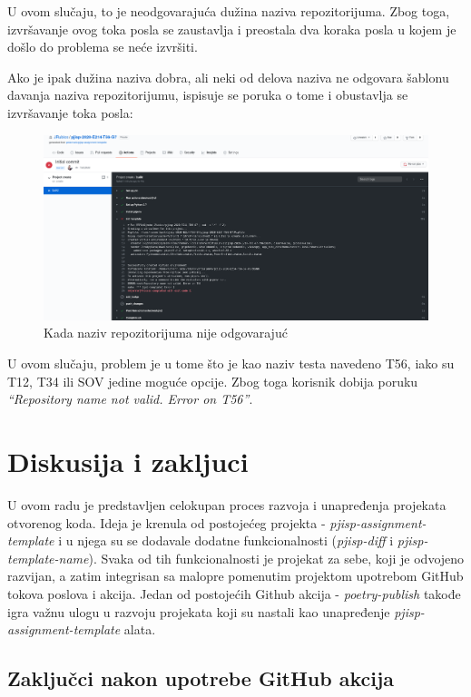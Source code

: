 \documentclass[12pt]{report}
\begin{document}
U ovom slučaju, to je neodgovarajuća dužina naziva repozitorijuma. Zbog toga, izvršavanje ovog toka posla se zaustavlja i preostala dva koraka posla u kojem je došlo do problema se neće izvršiti.

Ako je ipak dužina naziva dobra, ali neki od delova naziva ne odgovara šablonu davanja naziva repozitorijumu, ispisuje se poruka o tome i obustavlja se izvršavanje toka posla:

\begin{figure}[H]
    \centering
    \includegraphics[width=\linewidth]{images/20.png}
    \caption{Kada naziv repozitorijuma nije odgovarajuć}
\end{figure}

U ovom slučaju, problem je u tome što je kao naziv testa navedeno T56, iako su T12, T34 ili SOV jedine moguće opcije. Zbog toga korisnik dobija poruku \textit{``Repository name not valid. Error on T56''}.

\chapter{Diskusija i zakljuci}

U ovom radu je predstavljen celokupan proces razvoja i unapređenja projekata otvorenog koda. Ideja je krenula od postojećeg projekta - \textit{pjisp-assignment-template} i u njega su se dodavale dodatne funkcionalnosti (\textit{pjisp-diff} i \textit{pjisp-template-name}). Svaka od tih funkcionalnosti je projekat za sebe, koji je odvojeno razvijan, a zatim integrisan sa malopre pomenutim projektom upotrebom GitHub tokova poslova i akcija. Jedan od postojećih Github akcija - \textit{poetry-publish} takođe igra važnu ulogu u razvoju projekata koji su nastali kao unapređenje \textit{pjisp-assignment-template} alata.

\section{Zaključci nakon upotrebe GitHub akcija}
\end{document}
